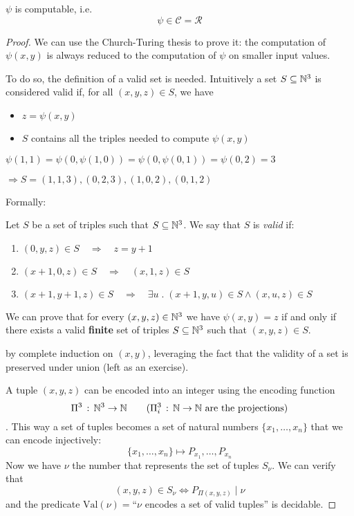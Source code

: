 \begin{theorem}
  $\psi$ is computable, i.e.
  \[\psi \in \mathcal{C} = \mathcal{R}\]
  \begin{proof}
    We can use the Church-Turing thesis to prove it: the computation
    of $\psi(x,y)$ is always reduced to the computation of $\psi$ on
    smaller input values.

    To do so, the definition of a valid set is needed. Intuitively a
    set $S \subseteq \mathbb{N}^3$ is considered valid if, for all $(x,y,z) \in S$, we have
    \begin{itemize}
    \item $z = \psi(x,y)$
    \item $S$ contains all the
      triples needed to compute
      $\psi(x,y)$
    \end{itemize}
    \begin{example}
      $\psi(1,1) = \psi(0,\psi(1,0)) = \psi(0,\psi(0,1)) = \psi(0,2) = 3$

      $\Rightarrow S = {(1,1,3), (0,2,3), (1,0,2), (0,1,2)}$
    \end{example}
    Formally:
    \begin{definition}
      Let $S$ be a set of triples such that $S \subseteq \mathbb{N}^3$. We say
      that $S$ is \emph{valid} if:
      \begin{enumerate}
      \item \((0,y,z) \in S \quad \Rightarrow \quad z = y+1\)
      \item \((x+1,0,z) \in S \quad \Rightarrow \quad (x,1,z) \in S\)
      \item \((x+1,y+1,z) \in S \quad \Rightarrow \quad \exists u \;.\; (x+1,
        y, u) \in S \wedge (x,u,z) \in S \)
      \end{enumerate}
    \end{definition}

    We can prove that for every $(x,y,z)\in\mathbb{N}^3$ we have
   $\psi(x,y) = z$ if and only if there exists a valid \textbf{finite} set of triples $S \subseteq \mathbb{N}^3$ 
    such that \((x,y,z) \in S\).
    
    by complete induction on
    $(x,y)$, leveraging the fact that the validity of a set is
    preserved under union (left as an exercise).

    \newcommand{\vnu}{\text{Val}(\nu)}

    A tuple $(x,y,z)$ can be encoded into an integer using the
    encoding function
    \[\Pi^3 \, : \, \mathbb{N}^3 \rightarrow \mathbb{N} \quad \quad (\Pi_i^3 \, : \,
      \mathbb{N} \rightarrow \mathbb{N} \text{ are the projections})\]. This way a
    set of tuples becomes a set of natural numbers
    $\{x_1, \dots, x_n\}$ that we can encode injectively:
    \[\{x_1, \dots, x_n\} \mapsto P_{x_1}, \dots, P_{x_n}\] Now we
    have $\nu$ the number that represents the set of tuples
    $S_\nu$. We can verify that
    \[(x,y,z) \in S_\nu \Longleftrightarrow P_{\Pi(x,y,z)} \; | \;
      \nu \] and the predicate $\vnu=$``$\nu$ encodes a
    set of valid tuples'' is decidable.


\end{proof}
\end{theorem}
